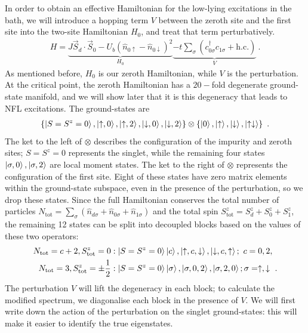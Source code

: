 \documentclass{iopart}
\begin{document}
In order to obtain an effective Hamiltonian for the low-lying excitations in the bath, we will introduce a hopping term \(V\) between the zeroth site and the first site into the two-site Hamiltonian \(H_0\), and treat that term perturbatively. 
\begin{eqnarray}
	H = \underbrace{J \vec{S}_d\cdot\vec{S}_0 - U_b \left( \hat n_{0 \uparrow} - \hat n_{0 \downarrow} \right)^2 }_{H_0} \underbrace{- t\sum_\sigma\left( c^\dagger_{0\sigma}c_{1\sigma} + \text{h.c.}\right)}_V~.
\end{eqnarray}
As mentioned before, \(H_0\) is our zeroth Hamiltonian, while \(V\) is the perturbation. At the critical point, the zeroth Hamiltonian has a \(20-\)fold degenerate ground-state manifold, and we will show later that it is this degeneracy that leads to NFL excitations. The ground-states are
\begin{eqnarray}
	\left\{\ket{S=S^z=0}, \ket{\uparrow, 0}, \ket{\uparrow, 2}, \ket{\downarrow, 0}, \ket{\downarrow, 2}\right\}\otimes\left\{\ket{0},\ket{\uparrow},\ket{\downarrow},\ket{\uparrow \downarrow}\right\}~.
\end{eqnarray}
The ket to the left of \(\otimes\) describes the configuration of the impurity and zeroth sites; \(S=S^z=0\) represents the singlet, while the remaining four states \(\ket{\sigma, 0},\ket{\sigma,2}\) are local moment states. The ket to the right of \(\otimes\) represents the configuration of the first site. Eight of these states have zero matrix elements within the ground-state subspace, even in the presence of the perturbation, so we drop these states. Since the full Hamiltonian conserves the total number of particles \(N_\text{tot} = \sum_\sigma\left(\hat n_{d\sigma} + \hat n_{0\sigma} + \hat n_{1\sigma}\right)\) and the total spin \(S_\text{tot}^z = S_d^z + S_0^z + S_1^z\), the remaining 12 states can be split into decoupled blocks based on the values of these two operators:
\begin{eqnarray}
	N_\text{tot} = c+2, S_\text{tot}^z = 0&: \ket{S=S^z=0}\ket{c}, \ket{\uparrow, c, \downarrow}, \ket{\downarrow, c, \uparrow}; ~c=0,2, \nonumber\\
	N_\text{tot} = 3, S_\text{tot}^z = \pm\frac{1}{2}&: \ket{S=S^z=0}\ket{\sigma}, \ket{\sigma, 0, 2}, \ket{\sigma, 2, 0};\sigma=\uparrow,\downarrow~.
\end{eqnarray}
The perturbation \(V\) will lift the degeneracy in each block; to calculate the modified spectrum, we diagonalise each block in the presence of \(V\). We will first write down the action of the perturbation on the singlet ground-states: this will make it easier to identify the true eigenstates.
\end{document}
